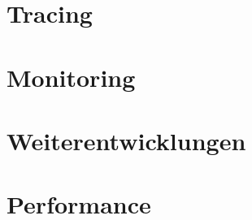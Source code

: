 \section{Tracing}\label{sec:tracing-verfahren}



\section{Monitoring}\label{sec:monitoring-verfahren}



\section{Weiterentwicklungen}\label{sec:weiterentwicklungen}


\section{Performance}\label{sec:performance}